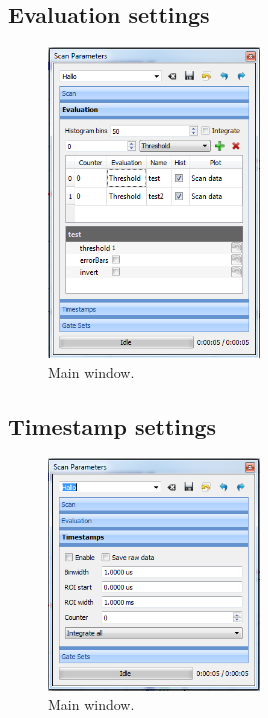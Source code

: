 \documentclass[11pt]{scrartcl}
\begin{document}
\subsection{Evaluation settings}
\begin{figure}[htbp]
\begin{center}
\includegraphics[width=0.5\textwidth]{ScanParametersEvaluation}
\end{center}
\caption{\label{PulseProgram} Main window.}
\end{figure}

\subsection{Timestamp settings}
\begin{figure}[htbp]
\begin{center}
\includegraphics[width=0.5\textwidth]{ScanParametersTimestamps}
\end{center}
\caption{\label{PulseProgram} Main window.}
\end{figure}
\end{document}
